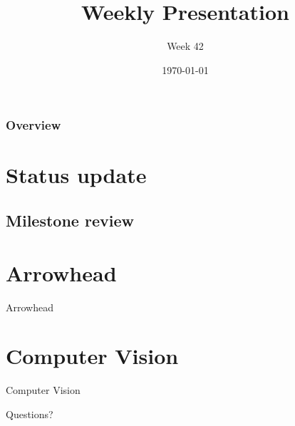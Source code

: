 \documentclass{beamer}
\title{Weekly Presentation}
\subtitle{Week 42}
\author{}
\institute{Luleå University of Technology}
\date{\today}
\begin{document}
\begin{frame}
    \titlepage
\end{frame}

\begin{frame}
    \frametitle{Overview}
    \tableofcontents
\end{frame}

\section{Status update}
%
\subsection{Milestone review}



\section{Arrowhead}
\begin{frame}
    \centering
    \Huge Arrowhead
\end{frame}

\section{Computer Vision}
\begin{frame}
    \centering
    \Huge Computer Vision
\end{frame}



\begin{frame}
    \begin{center}
        \Huge Questions?
    \end{center}
\end{frame}
\end{document}
